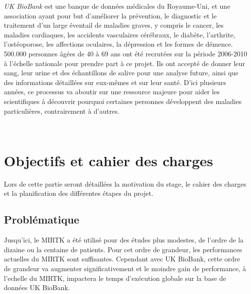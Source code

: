 \documentclass[10pt]{report}
\begin{document}
	 \textit{UK BioBank} est une banque de données médicales du Royaume-Uni, et une association  ayant pour but d'améliorer la prévention, le diagnostic et le traitement d'un large éventail de maladies graves, y compris le cancer, les maladies cardiaques, les accidents vasculaires cérébraux, le diabète, l'arthrite, l'ostéoporose, les affections oculaires, la dépression et les formes de démence. 500.000 personnes âgées de 40 à 69 ans ont été recrutées sur la période 2006-2010 à l'échelle nationale pour prendre part à ce projet. Ils ont accepté de donner leur sang, leur urine et des échantillons de salive pour une analyse future, ainsi que des informations détaillées sur eux-mêmes et sur leur santé. D'ici plusieurs années, ce processus va aboutir sur une ressource majeure pour aider les scientifiques à découvrir pourquoi certaines personnes développent des maladies particulières, contrairement à d'autres.~\par~\par
	 
	 
	 
\chapter{Objectifs et cahier des charges}
	Lors de cette partie seront détaillées la motivation du stage, le cahier des charges et la planification des différentes étapes du projet.
	\section{Problématique} 
	Jusqu'ici, le MIRTK a été utilisé pour des études plus modestes, de l'ordre de la dizaine ou la centaine de patients. Pour cet ordre de grandeur, les performances actuelles du MIRTK sont suffisantes. Cependant avec UK BioBank, cette ordre de grandeur va augmenter significativement et le moindre gain de performance, à l'echelle du MIRTK, impactera le temps d'exécution globale sur la base de données UK BioBank.\\ ~\par
	
\end{document}
